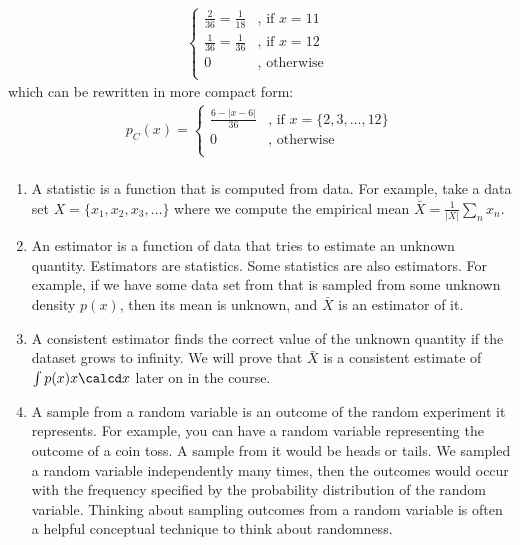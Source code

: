 \begin{enumerate}[label=\alph*.]
\begin{align*}
\begin{cases}
\frac{2}{36} = \frac{1}{18} &\text{, if } x = 11\\
\frac{1}{36} = \frac{1}{36} &\text{, if } x = 12\\
0 &\text{, otherwise } \\
\end{cases}
\end{align*}
which can be rewritten in more compact form:
\begin{align*}
p_C(x) = \begin{cases}
\frac{6 - |x-6|}{36} &\text{, if } x = \{ 2, 3, \ldots, 12\}\\
0 &\text{, otherwise } \\
\end{cases}
\end{align*}
\end{enumerate}


\paragraph{}
\begin{enumerate}[label=\alph*.]
\item A statistic is a function that is computed from data. For example, take a data set $X = \{x_1, x_2, x_3, \dots\}$ where we compute the empirical mean $\bar X = \frac{1}{|X|}\sum_n x_n$.
\item An estimator is a function of data that tries to estimate an unknown quantity. Estimators are statistics. Some statistics are also estimators. For example, if we have some data set from that is sampled from some unknown density $p(x)$, then its mean is unknown, and $\bar X$ is an estimator of it.
\item A consistent estimator finds the correct value of the unknown quantity if the dataset grows to infinity. We will prove that $\bar X$ is a consistent estimate of $\int p(x) x \calcd x$ later on in the course.
\item A sample from a random variable is an outcome of the random experiment it represents. For example, you can have a random variable representing the outcome of a coin toss. A sample from it would be heads or tails. We sampled a random variable independently many times, then the outcomes would occur with the frequency specified by the probability distribution of the random variable. Thinking about sampling outcomes from a random variable is often a helpful conceptual technique to think about randomness.
\end{enumerate}

